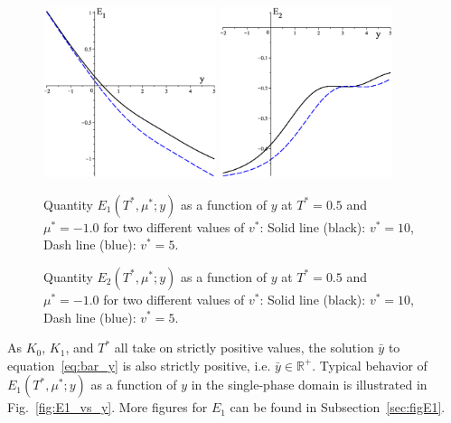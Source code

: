 \documentclass[12pt]{article}
\numberwithin{equation}{section}
\begin{document}
	\begin{figure}[htbp]
		\includegraphics[width=0.45\textwidth,angle=0]{images/E1_vs_y2}
		\hfill
		\includegraphics[width=0.45\textwidth,angle=0]{images/E2_vs_y}
		\\
		\parbox{0.45\textwidth}{\caption{\label{fig:E1_vs_y} Quantity $E_1(T^*,\mu^*;y)$ as a function of $y$ at $T^*=0.5$ and $\mu^*=-1.0$ for two different values of $v^*$: Solid line (black): $v^* = 10$, Dash line (blue): $v^* = 5$.}}
		\hfill
		\parbox{0.45\textwidth}{\caption{\label{fig:E2_vs_y} Quantity $E_2(T^*,\mu^*;y)$ as a function of $y$ at $T^*=0.5$ and $\mu^*=-1.0$ for two different values of $v^*$: Solid line (black): $v^* = 10$, Dash line (blue): $v^* = 5$.}}
	\end{figure}
	
	As $K_0$, $K_1$, and $T^*$ all take on strictly positive values, the solution $\bar{y}$ to equation~\eqref{eq:bar_y} is also strictly positive, i.e. $\bar{y} \in \mathbb{R}^{+}$.
	Typical behavior of $E_1(T^*,\mu^*;y)$ as a function of $y$ in the single-phase domain is illustrated in Fig.~\ref{fig:E1_vs_y}. More figures for $E_1$ can be found in Subsection~\ref{sec:figE1}.
	
\end{document}
